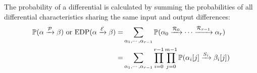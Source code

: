 The probability of a differential is calculated by summing the probabilities of all differential characteristics sharing the same input and output differences:
\begin{align*}
    \mathbb{P}(\alpha\xrightarrow{\mathcal{P}}\beta) \text{ or } \text{EDP}(\alpha\xrightarrow{\mathcal{E}}\beta)=&\sum\limits_{\alpha_1,\cdots,\alpha_{r-1}}\mathbb{P}(\alpha_0\xrightarrow{\mathcal{R}_0}\cdots\xrightarrow{\mathcal{R}_{r-1}}\alpha_r)\\
    =&\sum\limits_{\alpha_1,\cdots,\alpha_{r-1}}\prod\limits_{i=0}^{r-1}\prod\limits_{j=0}^{m-1}\mathbb{P}(\alpha_i[j]\xrightarrow{S_i}\beta_i[j])
\end{align*}




